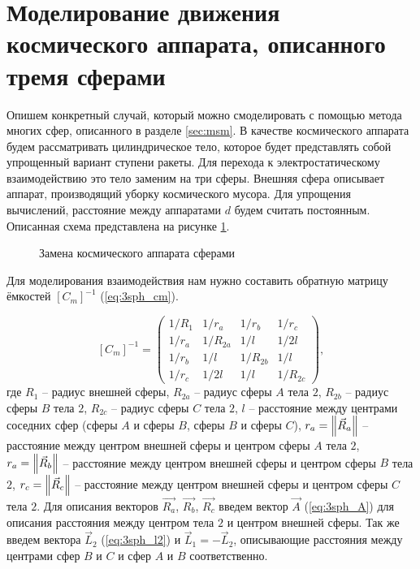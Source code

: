 \section{Моделирование движения космического аппарата, описанного тремя сферами}

Опишем конкретный случай, который можно смоделировать с помощью метода многих сфер, описанного в разделе \ref{sec:msm}.
В качестве космического аппарата будем рассматривать цилиндрическое тело, которое будет представлять собой упрощенный вариант ступени ракеты.
Для перехода к электростатическому взаимодействию это тело заменим на три сферы.
Внешняя сфера описывает аппарат, производящий уборку космического мусора.
Для упрощения вычислений, расстояние между аппаратами $d$ будем считать постоянным.
Описанная схема представлена на рисунке \ref{ris:3sph}.

\begin{figure}[H]
	\caption{Замена космического аппарата сферами}
	\label{ris:3sph}
\end{figure}

Для моделирования взаимодействия нам нужно составить обратную матрицу ёмкостей $[C_m]^{-1}$ (\ref{eq:3sph_cm}).

\begin{equation}
\label{eq:3sph_cm}
	[C_m]^{-1} = 
	\begin{pmatrix}
		1/R_1	&	1/r_a	&	1/r_b	&	1/r_c\\
		1/r_a	&	1/R_{2a}	&	1/l		&	1/2l\\
		1/r_b	&	1/l		&	1/R_{2b}	&	1/l\\
		1/r_c	&	1/2l		&	1/l		&	1/R_{2c}
	\end{pmatrix},
\end{equation}
где $R_1$ – радиус внешней сферы, $R_{2a}$ – радиус сферы $A$ тела $2$, $R_{2b}$ – радиус сферы $B$ тела $2$, $R_{2c}$ – радиус сферы $C$ тела $2$, $l$ – расстояние между центрами соседних сфер (сферы $A$ и сферы $B$, сферы $B$ и сферы $C$), $r_a = \left\lVert\vec{R}_a\right\rVert$ – расстояние между центром внешней сферы и центром сферы $A$ тела $2$, $r_a = \left\lVert\vec{R}_b\right\rVert$ – расстояние между центром внешней сферы и центром сферы $B$ тела $2$, $r_c = \left\lVert\vec{R}_c\right\rVert$ – расстояние между центром внешней сферы и центром сферы $C$ тела $2$.
Для описания векторов $\vec{R_a}$, $\vec{R_b}$, $\vec{R_c}$ введем вектор $\vec{A}$ (\ref{eq:3sph_A}) для описания расстояния между центром тела $2$ и центром внешней сферы.
Так же введем вектора $\vec{L}_2$ (\ref{eq:3sph_l2}) и $\vec{L}_1 = -\vec{L}_2$, описывающие расстояния между центрами сфер $B$ и $C$ и сфер $A$ и $B$ соответственно.

